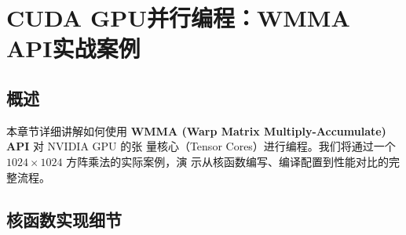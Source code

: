 \section{CUDA GPU并行编程：WMMA API实战案例}

\subsection{概述}
本章节详细讲解如何使用 \textbf
{WMMA (Warp Matrix Multiply-Accumulate) API} 对 NVIDIA GPU 的张
量核心（Tensor Cores）进行编程。我们将通过一个 $1024\times 1024$ 方阵乘法的实际案例，演
示从核函数编写、编译配置到性能对比的完整流程。

\subsection{核函数实现细节}

